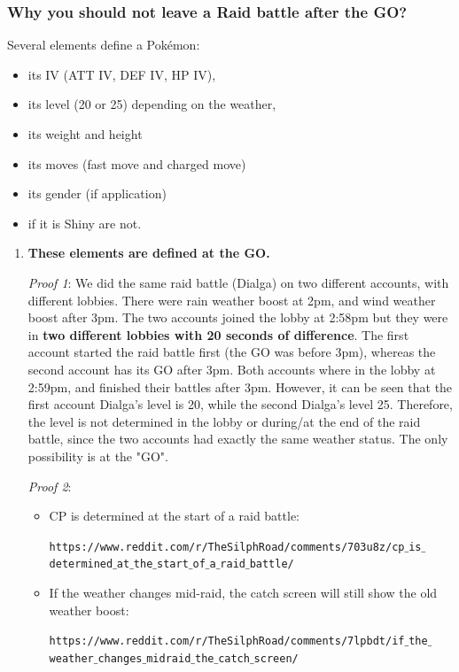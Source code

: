 \documentclass[8pt,aspectratio=169,compress]{beamer}
\begin{document}
\begin{frame}
\frametitle{Why you should not leave a Raid battle after the GO?}

\begin{block}{}
\begin{tiny}
\parbox{0.75\linewidth}{
Several elements define a Pokémon:
\begin{itemize}
\item its IV (ATT IV, DEF IV, HP IV),
\item its level (20 or 25) depending on the weather,
\item its weight and height
\item its moves (fast move and charged move)
\item its gender (if application)
\item if it is Shiny are not.
\end{itemize}

\bigskip

\begin{enumerate}
  \item \textbf{These elements are defined at the GO. } 

\emph{Proof 1}: We did the same raid battle (Dialga) on two different accounts, with different lobbies. There were rain weather boost at 2pm, and wind weather boost after 3pm. The two accounts joined the lobby at 2:58pm but they were in \textbf{two different lobbies with 20 seconds of difference}. The first account started the raid battle first (the GO was before 3pm), whereas the second account has its GO after 3pm. Both accounts where in the lobby at 2:59pm, and finished their battles after 3pm. However, it can be seen that the first account Dialga's level is 20, while the second Dialga's level 25. Therefore, the level is not determined in the lobby or during/at the end of the raid battle, since the two accounts had exactly the same weather status. The only possibility is at the "GO".

\emph{Proof 2}:
\begin{itemize}
  \item \tiny CP is determined at the start of a raid battle:
  
\tiny \texttt{https://www.reddit.com/r/TheSilphRoad/comments/703u8z/cp$\_$is$\_$determined$\_$at$\_$the$\_$start$\_$of$\_$a$\_$raid$\_$battle/}
  \item\tiny If the weather changes mid-raid, the catch screen will still show the old weather boost: 
  
\tiny \texttt{https://www.reddit.com/r/TheSilphRoad/comments/7lpbdt/if$\_$the$\_$weather$\_$changes$\_$midraid$\_$the$\_$catch$\_$screen/}
\end{itemize}


\end{enumerate}}
\end{tiny}
\end{block}
\end{frame}
\end{document}
